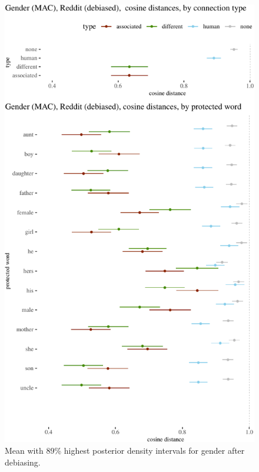 \documentclass{clv3}
\begin{document}
\begin{figure}

\begin{center}\includegraphics{figures/figdebiasedCosinePair2_e} \end{center}
\caption{Mean with 89\% highest posterior density intervals for gender after debiasing.}
\label{fig:empiricalDebiased}
\end{figure}
\end{document}
